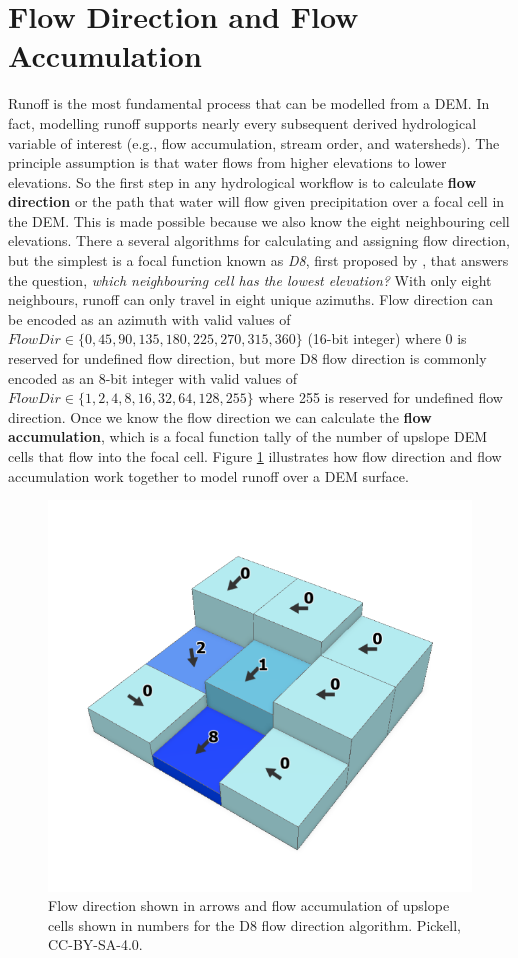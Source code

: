 \documentclass[
]{book}
\begin{document}
\hypertarget{flow-direction-and-flow-accumulation}{%
\section{Flow Direction and Flow Accumulation}\label{flow-direction-and-flow-accumulation}}

Runoff is the most fundamental process that can be modelled from a DEM. In fact, modelling runoff supports nearly every subsequent derived hydrological variable of interest (e.g., flow accumulation, stream order, and watersheds). The principle assumption is that water flows from higher elevations to lower elevations. So the first step in any hydrological workflow is to calculate \textbf{flow direction} or the path that water will flow given precipitation over a focal cell in the DEM. This is made possible because we also know the eight neighbouring cell elevations. There a several algorithms for calculating and assigning flow direction, but the simplest is a focal function known as \emph{D8}, first proposed by \citet{greenlee_raster_1987}, that answers the question, \emph{which neighbouring cell has the lowest elevation?} With only eight neighbours, runoff can only travel in eight unique azimuths. Flow direction can be encoded as an azimuth with valid values of \(FlowDir∈\{0,45,90,135,180,225,270,315,360\}\) (16-bit integer) where 0 is reserved for undefined flow direction, but more D8 flow direction is commonly encoded as an 8-bit integer with valid values of \(FlowDir∈\{1,2,4,8,16,32,64,128,255\}\) where 255 is reserved for undefined flow direction. Once we know the flow direction we can calculate the \textbf{flow accumulation}, which is a focal function tally of the number of upslope DEM cells that flow into the focal cell. Figure \ref{fig:9-flow-direction-accumulation} illustrates how flow direction and flow accumulation work together to model runoff over a DEM surface.

\begin{figure}
\includegraphics[width=0.75\linewidth]{images/09-flow-direction-accumulation} \caption{Flow direction shown in arrows and flow accumulation of upslope cells shown in numbers for the D8 flow direction algorithm. Pickell, CC-BY-SA-4.0.}\label{fig:9-flow-direction-accumulation}
\end{figure}
\end{document}
